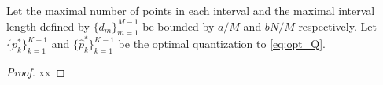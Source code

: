 \begin{theorem}
Let the maximal number of points in each interval and the maximal interval length defined by $\{d_m\}_{m=1}^{M-1}$ be bounded by $a/M$ and $bN/M$ respectively. Let $\{p^*_k\}_{k=1}^{K-1}$ and $\{\hat{p}^*_k\}_{k=1}^{K-1}$ be the optimal quantization to \eqref{eq:opt_Q}. 
\end{theorem}

\begin{proof}
xx
\end{proof}

















